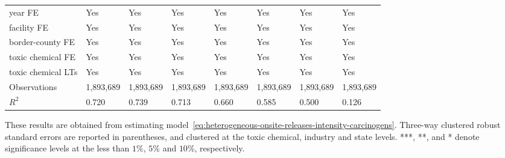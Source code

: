 \begin{table}[H]
{\begin{tabular}{@{}llllllll@{}}
            year FE                         & Yes       & Yes           & Yes       & Yes          & Yes             & Yes           & Yes                 \\
            facility FE                     & Yes       & Yes           & Yes       & Yes          & Yes             & Yes           & Yes                 \\
            border-county FE                & Yes       & Yes           & Yes       & Yes          & Yes             & Yes           & Yes                 \\
            toxic chemical FE               & Yes       & Yes           & Yes       & Yes          & Yes             & Yes           & Yes                 \\
            toxic chemical LTs              & Yes       & Yes           & Yes       & Yes          & Yes             & Yes           & Yes                 \\ \midrule
            Observations                    & 1,893,689 & 1,893,689     & 1,893,689 & 1,893,689    & 1,893,689       & 1,893,689     & 1,893,689           \\
            $R^2$                           & 0.720     & 0.739         & 0.713     & 0.660        & 0.585           & 0.500         & 0.126               \\ \bottomrule\bottomrule
        \end{tabular}%
    }
    \begin{minipage}{18cm}
        \vspace{0.05in}
        These results are obtained from estimating model~\ref{eq:heterogeneous-onsite-releases-intensity-carcinogens}. Three-way clustered robust standard errors are reported in parentheses, and clustered at the toxic chemical, industry and state levels. ***, **, and * denote significance levels at the less than $1\%$, $5\%$ and $10\%$, respectively.
    \end{minipage}
\end{table}